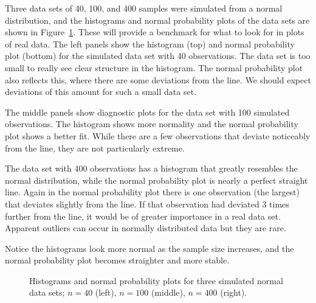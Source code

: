 \begin{examplewrap}
\begin{nexample}{Three data sets of 40, 100, and 400
    samples were simulated from a normal distribution,
    and the histograms and normal probability plots
    of the data sets are shown in Figure~\ref{normalExamples}.
    These will provide a benchmark for what to look for
    in plots of real data.}
  \label{normalExamplesExample}%
  The left panels show the histogram (top) and normal
  probability plot (bottom) for the simulated data set
  with 40 observations.
  The data set is too small to really see clear structure
  in the histogram.
  The normal probability plot also reflects this,
  where there are some deviations from the line.
  We should expect deviations of this amount for
  such a small data set.

  The middle panels show diagnostic plots for the
  data set with 100 simulated observations.
  The histogram shows more normality and the normal
  probability plot shows a better fit.
  While there are a few observations that deviate
  noticeably from the line, they are not particularly
  extreme.

  The data set with 400 observations has a histogram
  that greatly resembles the normal distribution,
  while the normal probability plot is nearly a perfect
  straight line.
  Again in the normal probability plot there is one
  observation (the largest) that deviates slightly from
  the line.
  If that observation had deviated 3 times further from
  the line, it would be of greater importance in a real
  data set.
  Apparent outliers can occur in normally distributed
  data but they are rare.

  Notice the histograms look more normal as the sample
  size increases, and the normal probability plot becomes
  straighter and more stable.
\end{nexample}
\end{examplewrap}

\begin{figure}
  \centering
  \caption{Histograms and normal probability plots for
      three simulated normal data sets; $n=40$ (left),
      $n=100$ (middle), $n=400$ (right).}
  \label{normalExamples}
\end{figure}

